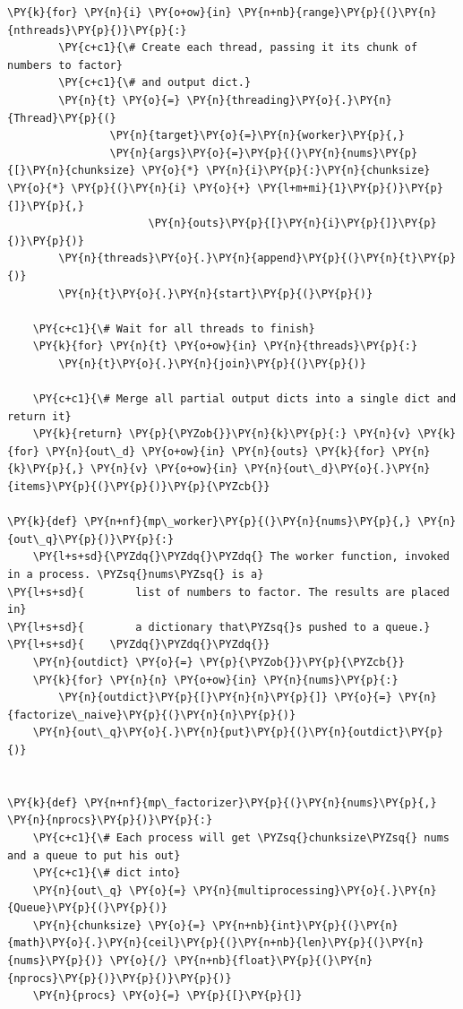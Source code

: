 \begin{Verbatim}[label=\makebox{\url{https://github.com/lucabaldini/cmepda/tree/master/slides/latex/snippets/benchmark_comparison.py}},commandchars=\\\{\}]
    \PY{k}{for} \PY{n}{i} \PY{o+ow}{in} \PY{n+nb}{range}\PY{p}{(}\PY{n}{nthreads}\PY{p}{)}\PY{p}{:}
        \PY{c+c1}{\# Create each thread, passing it its chunk of numbers to factor}
        \PY{c+c1}{\# and output dict.}
        \PY{n}{t} \PY{o}{=} \PY{n}{threading}\PY{o}{.}\PY{n}{Thread}\PY{p}{(}
                \PY{n}{target}\PY{o}{=}\PY{n}{worker}\PY{p}{,}
                \PY{n}{args}\PY{o}{=}\PY{p}{(}\PY{n}{nums}\PY{p}{[}\PY{n}{chunksize} \PY{o}{*} \PY{n}{i}\PY{p}{:}\PY{n}{chunksize} \PY{o}{*} \PY{p}{(}\PY{n}{i} \PY{o}{+} \PY{l+m+mi}{1}\PY{p}{)}\PY{p}{]}\PY{p}{,}
                      \PY{n}{outs}\PY{p}{[}\PY{n}{i}\PY{p}{]}\PY{p}{)}\PY{p}{)}
        \PY{n}{threads}\PY{o}{.}\PY{n}{append}\PY{p}{(}\PY{n}{t}\PY{p}{)}
        \PY{n}{t}\PY{o}{.}\PY{n}{start}\PY{p}{(}\PY{p}{)}

    \PY{c+c1}{\# Wait for all threads to finish}
    \PY{k}{for} \PY{n}{t} \PY{o+ow}{in} \PY{n}{threads}\PY{p}{:}
        \PY{n}{t}\PY{o}{.}\PY{n}{join}\PY{p}{(}\PY{p}{)}

    \PY{c+c1}{\# Merge all partial output dicts into a single dict and return it}
    \PY{k}{return} \PY{p}{\PYZob{}}\PY{n}{k}\PY{p}{:} \PY{n}{v} \PY{k}{for} \PY{n}{out\_d} \PY{o+ow}{in} \PY{n}{outs} \PY{k}{for} \PY{n}{k}\PY{p}{,} \PY{n}{v} \PY{o+ow}{in} \PY{n}{out\_d}\PY{o}{.}\PY{n}{items}\PY{p}{(}\PY{p}{)}\PY{p}{\PYZcb{}}

\PY{k}{def} \PY{n+nf}{mp\_worker}\PY{p}{(}\PY{n}{nums}\PY{p}{,} \PY{n}{out\_q}\PY{p}{)}\PY{p}{:}
    \PY{l+s+sd}{\PYZdq{}\PYZdq{}\PYZdq{} The worker function, invoked in a process. \PYZsq{}nums\PYZsq{} is a}
\PY{l+s+sd}{        list of numbers to factor. The results are placed in}
\PY{l+s+sd}{        a dictionary that\PYZsq{}s pushed to a queue.}
\PY{l+s+sd}{    \PYZdq{}\PYZdq{}\PYZdq{}}
    \PY{n}{outdict} \PY{o}{=} \PY{p}{\PYZob{}}\PY{p}{\PYZcb{}}
    \PY{k}{for} \PY{n}{n} \PY{o+ow}{in} \PY{n}{nums}\PY{p}{:}
        \PY{n}{outdict}\PY{p}{[}\PY{n}{n}\PY{p}{]} \PY{o}{=} \PY{n}{factorize\_naive}\PY{p}{(}\PY{n}{n}\PY{p}{)}
    \PY{n}{out\_q}\PY{o}{.}\PY{n}{put}\PY{p}{(}\PY{n}{outdict}\PY{p}{)}


\PY{k}{def} \PY{n+nf}{mp\_factorizer}\PY{p}{(}\PY{n}{nums}\PY{p}{,} \PY{n}{nprocs}\PY{p}{)}\PY{p}{:}
    \PY{c+c1}{\# Each process will get \PYZsq{}chunksize\PYZsq{} nums and a queue to put his out}
    \PY{c+c1}{\# dict into}
    \PY{n}{out\_q} \PY{o}{=} \PY{n}{multiprocessing}\PY{o}{.}\PY{n}{Queue}\PY{p}{(}\PY{p}{)}
    \PY{n}{chunksize} \PY{o}{=} \PY{n+nb}{int}\PY{p}{(}\PY{n}{math}\PY{o}{.}\PY{n}{ceil}\PY{p}{(}\PY{n+nb}{len}\PY{p}{(}\PY{n}{nums}\PY{p}{)} \PY{o}{/} \PY{n+nb}{float}\PY{p}{(}\PY{n}{nprocs}\PY{p}{)}\PY{p}{)}\PY{p}{)}
    \PY{n}{procs} \PY{o}{=} \PY{p}{[}\PY{p}{]}


\end{Verbatim}
